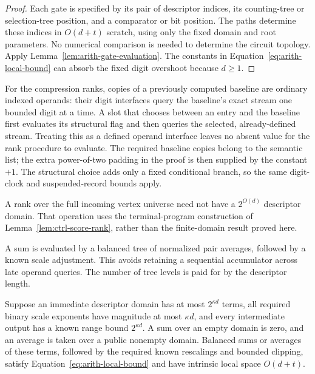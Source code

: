 \begin{proof}
Each gate is specified by its pair of descriptor indices, its
counting-tree or selection-tree position, and a comparator or bit
position.  The paths determine these indices in $O(d+t)$ scratch,
using only the fixed domain and root parameters.  No numerical
comparison is needed to determine the circuit topology.  Apply
Lemma~\ref{lem:arith-gate-evaluation}.  The constants in
Equation~\eqref{eq:arith-local-bound} can absorb the fixed digit
overshoot because $d\geq1$.
\end{proof}

For the compression ranks, copies of a previously computed baseline
are ordinary indexed operands: their digit interfaces query the
baseline's exact stream one bounded digit at a time.  A slot that
chooses between an entry and the baseline first evaluates its
structural flag and then queries the selected, already-defined stream.
Treating this as a defined operand interface leaves no absent value
for the rank procedure to evaluate.
The required baseline copies belong to the semantic list; the extra
power-of-two padding in the proof is then supplied by the constant
$+1$.  The structural choice adds only a fixed conditional branch,
so the same digit-clock and suspended-record bounds apply.

A rank over the full incoming vertex universe need not have a $2^{O(d)}$ descriptor domain. That operation uses the terminal-program construction of Lemma~\ref{lem:ctrl-score-rank}, rather than the finite-domain result proved here.

A sum is evaluated by a balanced tree of normalized pair averages, followed by a known scale adjustment. This avoids retaining a sequential accumulator across late operand queries. The number of tree levels is paid for by the descriptor length.

\begin{lemma}
\label{lem:arith-sums-scales}
Suppose an immediate descriptor domain has at most $2^{\kappa d}$
terms, all required binary scale exponents have magnitude at most
$\kappa d$, and every intermediate output has a known range bound
$2^{\kappa d}$.  A sum over an empty domain is zero, and an average
is taken over a public nonempty domain.  Balanced sums or averages of these terms, followed
by the required known rescalings and bounded clipping, satisfy
Equation~\eqref{eq:arith-local-bound} and have intrinsic local
space $O(d+t)$.
\end{lemma}

